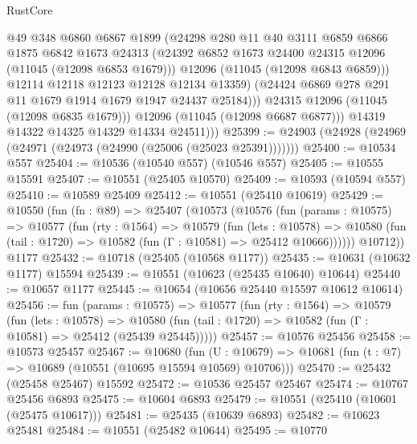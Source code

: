 \begin{lexlean}{RustCore}
\begin{coremodule}
                    @49
                    @348
                    @6860
                    @6867
                    @1899
                    (@24298
                      @280
                      @11
                      @40
                      @3111
                      @6859
                      @6866
                      @1875
                      @6842
                      @1673
                      @24313
                      (@24392 @6852 @1673 @24400 @24315 @12096 (@11045 (@12098 @6853 @1679)))
                      @12096
                      (@11045 (@12098 @6843 @6859)))
                    @12114
                    @12118
                    @12123
                    @12128
                    @12134
                    @13359)
                  (@24424 @6869 @278 @291 @11 @1679 @1914 @1679 @1947 @24437 @25184)))
              @24315
              @12096
              (@11045 (@12098 @6835 @1679)))
            @12096
            (@11045 (@12098 @6687 @6877)))
          @14319
          @14322
          @14325
          @14329
          @14334
          @24511)))
@25399 := @24903 (@24928 (@24969 (@24971 (@24973 (@24990 (@25006 (@25023 @25391)))))))
@25400 := @10534 @557
@25404 := @10536 (@10540 @557) (@10546 @557)
@25405 := @10555 @15591
@25407 := @10551 (@25405 @10570)
@25409 := @10593 (@10594 @557)
@25410 := @10589 @25409
@25412 := @10551 (@25410 @10619)
@25429 := @10550
    (fun (fn : @89) =>
    @25407
      (@10573
        (@10576
          (fun (params : @10575) =>
          @10577
            (fun (rty : @1564) =>
            @10579
              (fun (lets : @10578) =>
              @10580 (fun (tail : @1720) => @10582 (fun (Γ : @10581) => @25412 @10666))))))
        @10712))
    @1177
@25432 := @10718 (@25405 (@10568 @1177))
@25435 := @10631 (@10632 @1177) @15594
@25439 := @10551 (@10623 (@25435 @10640) @10644)
@25440 := @10657 @1177
@25445 := @10654 (@10656 @25440 @15597 @10612 @10614)
@25456 := fun (params : @10575) =>
  @10577
    (fun (rty : @1564) =>
    @10579
      (fun (lets : @10578) =>
      @10580 (fun (tail : @1720) => @10582 (fun (Γ : @10581) => @25412 (@25439 @25445)))))
@25457 := @10576 @25456
@25458 := @10573 @25457
@25467 := @10680
    (fun (U : @10679) => @10681 (fun (t : @7) => @10689 (@10551 (@10695 @15594 @10569) @10706)))
@25470 := @25432 (@25458 @25467) @15592
@25472 := @10536 @25457 @25467
@25474 := @10767 @25456 @6893
@25475 := @10604 @6893
@25479 := @10551 (@25410 (@10601 (@25475 @10617)))
@25481 := @25435 (@10639 @6893)
@25482 := @10623 @25481
@25484 := @10551 (@25482 @10644)
@25495 := @10770

\end{coremodule}
\end{lexlean}
